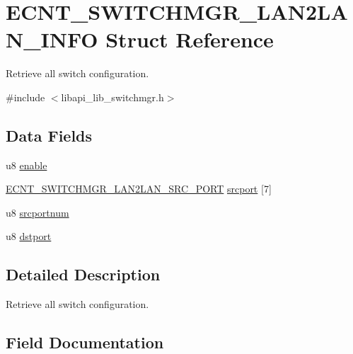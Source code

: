 \hypertarget{structECNT__SWITCHMGR__LAN2LAN__INFO}{}\section{E\+C\+N\+T\+\_\+\+S\+W\+I\+T\+C\+H\+M\+G\+R\+\_\+\+L\+A\+N2\+L\+A\+N\+\_\+\+I\+N\+FO Struct Reference}
\label{structECNT__SWITCHMGR__LAN2LAN__INFO}


Retrieve all switch configuration.  




{\ttfamily \#include $<$libapi\+\_\+lib\+\_\+switchmgr.\+h$>$}

\subsection*{Data Fields}
\begin{DoxyCompactItemize}
\item 
u8 \hyperlink{structECNT__SWITCHMGR__LAN2LAN__INFO_addac1d8e237c99da348917920b1a1f34}{enable}
\item 
\hyperlink{structECNT__SWITCHMGR__LAN2LAN__SRC__PORT}{E\+C\+N\+T\+\_\+\+S\+W\+I\+T\+C\+H\+M\+G\+R\+\_\+\+L\+A\+N2\+L\+A\+N\+\_\+\+S\+R\+C\+\_\+\+P\+O\+RT} \hyperlink{structECNT__SWITCHMGR__LAN2LAN__INFO_aa5378fc5beafd39aa5d253329609b7f3}{srcport} \mbox{[}7\mbox{]}
\item 
u8 \hyperlink{structECNT__SWITCHMGR__LAN2LAN__INFO_a31771803d9107eb3a9989b690cc30d77}{srcportnum}
\item 
u8 \hyperlink{structECNT__SWITCHMGR__LAN2LAN__INFO_aff7fe228f3372d89f60162a58c8d9967}{dstport}
\end{DoxyCompactItemize}


\subsection{Detailed Description}
Retrieve all switch configuration. 

\subsection{Field Documentation}
\mbox{\label{structECNT__SWITCHMGR__LAN2LAN__INFO_aff7fe228f3372d89f60162a58c8d9967}} 
